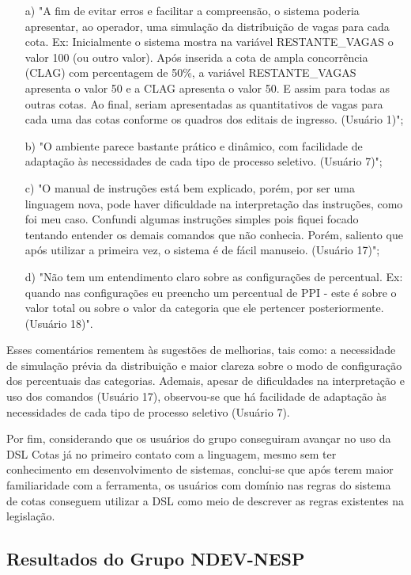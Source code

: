 \begin{enumerate}
    \item [a)] "A fim de evitar erros e facilitar a compreensão, o sistema poderia apresentar, ao operador, uma simulação da distribuição de vagas para cada cota. Ex: Inicialmente o sistema mostra na variável RESTANTE\_VAGAS o valor 100 (ou outro valor). Após inserida a cota de ampla concorrência (CLAG) com percentagem de 50\%, a variável RESTANTE\_VAGAS apresenta o valor 50 e a CLAG apresenta o valor 50. E assim para todas as outras cotas. Ao final, seriam apresentadas as quantitativos de vagas para cada uma das cotas conforme os quadros dos editais de ingresso. (Usuário 1)";
    \item [b)] "O ambiente parece bastante prático e dinâmico, com facilidade de adaptação às necessidades de cada tipo de processo seletivo. (Usuário 7)";    
    \item [c)] "O manual de instruções está bem explicado, porém, por ser uma linguagem nova, pode haver dificuldade na interpretação das instruções, como foi meu caso. Confundi algumas instruções simples pois fiquei focado tentando entender os demais comandos que não conhecia. Porém, saliento que após utilizar a primeira vez, o sistema é de fácil manuseio. (Usuário 17)";   
    \item [d)] "Não tem um entendimento claro sobre as configurações de percentual. Ex: quando nas configurações eu preencho um percentual de PPI -  este é sobre o valor total ou sobre o valor da categoria que ele pertencer posteriormente. (Usuário 18)".
\end{enumerate}

Esses comentários rementem às sugestões de melhorias, tais como: a necessidade de simulação prévia da distribuição e maior clareza sobre o modo de configuração dos percentuais das categorias. Ademais, apesar de dificuldades na interpretação e uso dos comandos (Usuário 17), observou-se que há facilidade de adaptação às necessidades de cada tipo de processo seletivo (Usuário 7).

Por fim, considerando que os usuários do grupo conseguiram avançar no uso da DSL Cotas já no primeiro contato com a linguagem, mesmo sem ter conhecimento em desenvolvimento de sistemas, conclui-se que após terem maior familiaridade com a ferramenta, os usuários com domínio nas regras do sistema de cotas conseguem utilizar a DSL como meio de descrever as regras existentes na legislação.


\subsection{Resultados do Grupo NDEV-NESP}
\label{subsec:ndevnesp}

